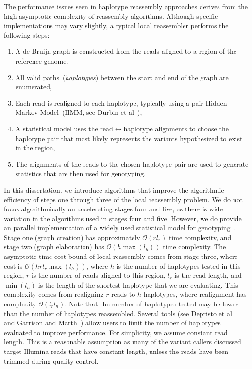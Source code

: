 \documentclass[phd]{ucbthesis}
\begin{document}
The performance issues seen in haplotype reassembly approaches derives from the high asymptotic
complexity of reassembly algorithms. Although specific implementations may vary slightly, a typical
local reassembler performs the following steps:

\begin{enumerate}
\item A de Bruijn graph is constructed from the reads aligned to a region of the reference genome,
\item All valid paths~(\emph{haplotypes}) between the start and end of the graph are enumerated,
\item Each read is realigned to each haplotype, typically using a pair Hidden Markov Model~(HMM,
see Durbin et al~\cite{durbin98}),
\item A statistical model uses the read$\leftrightarrow$haplotype alignments to choose the haplotype pair
that most likely represents the variants hypothesized to exist in the region, 
\item The alignments of the reads to the chosen haplotype pair are used to generate statistics that are
then used for genotyping.
\end{enumerate}

In this dissertation, we introduce algorithms that improve the algorithmic efficiency
of steps one through three of the local reassembly problem.
We do not focus algorithmically on accelerating stages four and five, as there is wide
variation in the algorithms used in stages four and five. However, we do provide an parallel
implementation of a widely used statistical model for genotyping~\cite{li11}. Stage one (graph
creation) has approximately $\mathcal{O}(r l_r)$ time complexity, and stage two (graph elaboration) has
$\mathcal{O}(h \max(l_h))$ time complexity.
The asymptotic time cost bound of local reassembly comes from stage three, where cost is $\mathcal{O}(h r l_r
\max(l_h))$, where $h$ is the number of haplotypes tested in this region, $r$ is the number of reads aligned to this region, $l_r$ is the read length,
and $\min(l_h)$ is the length of the
shortest haplotype that we are evaluating. This complexity comes from realigning $r$ reads to $h$
haplotypes, where realignment has complexity $\mathcal{O}(l_r l_h)$. Note that the number of
haplotypes tested may be lower than the number of haplotypes reassembled. Several tools
(see Depristo et al~\cite{depristo11} and Garrison and Marth~\cite{garrison12}) allow users to limit the number of haplotypes evaluated to improve
performance. For simplicity, we assume constant read length. This is a reasonable assumption as many of the variant
callers discussed target Illumina reads that have constant length, unless the reads have been trimmed
during quality control.
\end{document}
